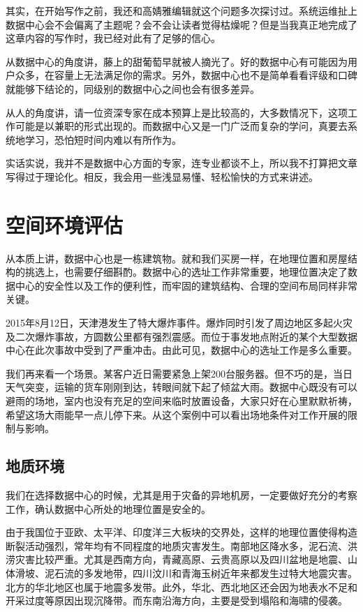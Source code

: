 \documentclass[12pt,UTF8]{ctexbook}
\begin{document}
其实，在开始写作之前，我还和高婧雅编辑就这个问题多次探讨过。系统运维扯上数据中心会不会偏离了主题呢？会不会让读者觉得枯燥呢？但是当我真正地完成了这章内容的写作时，我已经对此有了足够的信心。

从数据中心的角度讲，藤上的甜葡萄早就被人摘光了。好的数据中心有可能因为用户众多，在容量上无法满足你的需求。另外，数据中心也不是简单看看评级和口碑就能够下结论的，同级别的数据中心之间也会有很多差异。

从人的角度讲，请一位资深专家在成本预算上是比较高的，大多数情况下，这项工作可能是以兼职的形式出现的。而数据中心又是一门广泛而复杂的学问，真要去系统地学习，恐怕短时间内难以有所作为。

实话实说，我并不是数据中心方面的专家，连专业都谈不上，所以我不打算把文章写得过于理论化。相反，我会用一些浅显易懂、轻松愉快的方式来讲述。

\section{空间环境评估}

从本质上讲，数据中心也是一栋建筑物。就和我们买房一样，在地理位置和房屋结构的挑选上，也需要仔细斟酌。数据中心的选址工作非常重要，地理位置决定了数据中心的安全性以及工作的便利性，而牢固的建筑结构、合理的空间布局同样非常关键。

2015年8月12日，天津港发生了特大爆炸事件。爆炸同时引发了周边地区多起火灾及二次爆炸事故，方圆数公里都有强烈震感。而位于事发地点附近的某个大型数据中心在此次事故中受到了严重冲击。由此可见，数据中心的选址工作是多么重要。

我们再来看一个场景。某客户近日需要紧急上架200台服务器。但不巧的是，当日天气突变，运输的货车刚刚到达，转眼间就下起了倾盆大雨。数据中心既没有可以避雨的场地，室内也没有充足的空间来临时放置设备，大家只好在心里默默祈祷，希望这场大雨能早一点儿停下来。从这个案例中可以看出场地条件对工作开展的限制与影响。

\subsection{地质环境}

我们在选择数据中心的时候，尤其是用于灾备的异地机房，一定要做好充分的考察工作，确认数据中心所处的地理位置是安全的。

由于我国位于亚欧、太平洋、印度洋三大板块的交界处，这样的地理位置使得构造断裂活动强烈，常年均有不同程度的地质灾害发生。南部地区降水多，泥石流、洪涝灾害比较严重。尤其是西南方向，青藏高原、云贵高原以及四川盆地是地震、山体滑坡、泥石流的多发地带，四川汶川和青海玉树近年来都发生过特大地震灾害。北方的华北地区也属于地震多发带。此外，华北、西北地区还会因为地表水不足和开采过度等原因出现沉降带。而东南沿海方向，主要是受到塌陷和海啸的侵袭。
\end{document}
